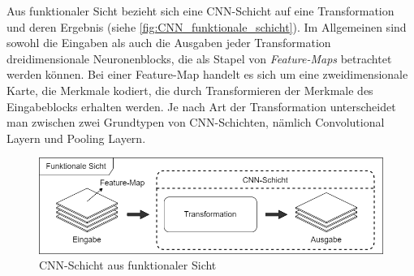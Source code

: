 Aus funktionaler Sicht bezieht sich eine CNN-Schicht auf eine Transformation und deren Ergebnis (siehe \autoref{fig:CNN_funktionale_schicht}). Im Allgemeinen sind sowohl die Eingaben als auch die Ausgaben jeder Transformation dreidimensionale Neuronenblocks, die als Stapel von \emph{Feature-Maps} betrachtet werden können. Bei einer Feature-Map handelt es sich um eine zweidimensionale Karte, die Merkmale kodiert, die durch Transformieren der Merkmale des Eingabeblocks erhalten werden. Je nach Art der Transformation unterscheidet man zwischen zwei Grundtypen von CNN-Schichten, nämlich Convolutional Layern und Pooling Layern.

\begin{figure}[!h]
	\centering
	\includegraphics[width=\linewidth]{images/CNN_funktionale_schicht}
	\caption{CNN-Schicht aus funktionaler Sicht}
	\label{fig:CNN_funktionale_schicht}
\end{figure}

